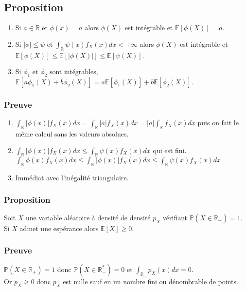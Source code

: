\documentclass[a4paper,10pt]{book} %
\newcommand{\R}{\mathbb{R}}
\newcommand{\E}{\mathbb{E}} %
\renewcommand{\P}{\mathbb{P}} %
\newcommand\abs[1]{\left|#1\right|}
\begin{document}
\subsection{Proposition}
\begin{enumerate}
\item Si $a\in \R$ et $\phi(x)=a$ alors $\phi(X)$ est intégrable et $\E[\phi(X)]=a$.\\

\item Si $\abs{\phi}\leq \psi$ et $\displaystyle \int_\R\psi(x)f_X(x)dx < +\infty$ alors $\phi(X)$ est intégrable et\\
$\E[\phi(X)]\leq \E[\abs{\phi(X)}]\leq \E[\psi(X)]$.

\item Si $\phi_1$ et $\phi_2$ sont intégrables, $\E[a\phi_1(X)+b\phi_2(X)]=a\E[\phi_1(X)]+b\E[\phi_2(X)]$.
\end{enumerate}

\subsubsection{Preuve}
\begin{enumerate}
\item $\displaystyle \int_\R \abs{\phi(x)}f_X(x)dx=\int_\R\abs{a}f_X(x)dx=\abs{a}\int_\R f_X(x)dx$ puis on fait le même calcul sans les valeurs absolues.
\item $\displaystyle \int_\R\abs{\phi(x)}f_X(x)dx\leq \int_\R\psi(x)f_X(x)dx$ qui est fini.\\
$\displaystyle \int_\R \phi(x)f_X(x)dx\leq \int_\R\abs{\phi(x)}f_X(x)dx\leq \int_\R \psi(x)f_X(x)dx$
\item Immédiat avec l'inégalité triangulaire.
\end{enumerate}

\subsubsection{Proposition}
Soit $X$ une variable aléatoire à densité de densité $p_X$ vérifiant $\P(X\in \R_+)=1$. Si $X$ admet une espérance alors $\E[X]\geq 0$.

\subsubsection{Preuve}
$\P(X\in \R_+)=1$ donc $\P(X\in \R_-^*) = 0$ et $\displaystyle \int_{\R_-}p_X(x)dx=0$.\\

Or $p_X\geq 0$ donc $p_X$ est nulle sauf en un nombre fini ou dénombrable de points.\\
\end{document}

